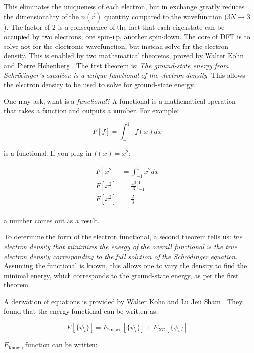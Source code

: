 This eliminates the uniqueness of each electron, but in exchange greatly reduces
the dimensionality of the $n(\vec r)$ quantity compared to the
wavefunction ($3N \rightarrow 3$). The
factor of 2 is a consequence of the fact that each eigenstate can be occupied
by two electrons, one spin-up, another spin-down. The core of DFT is
to solve not
for the electronic wavefunction, but instead solve for the electron
density. This
is enabled by two mathematical theorems, proved  by Walter Kohn and
Pierre Hohenberg \cite{hohenberg_kohn}.
The first theorem is: \textit{The ground-state energy from Schr\"odinger's
equation is a unique functional of the electron density.} This allows the
electron density to be used to solve for ground-state energy.

One may ask, what is a \textit{functional}? A functional is a mathematical
operation that takes a function and outputs a number. For example:

\begin{equation}
F[f] = \int_{-1}^1 f(x)dx
\end{equation}

\noindent is a functional. If you plug in $f(x) = x^2$:

\begin{align*}
F[x^2] &= \int_{-1}^1 x^2 dx \\
F[x^2] &= \frac{x^3}{3}\Biggr|_{-1}^1 \\
F[x^2] &= \frac{2}{3} \\
\end{align*}

\noindent a number comes out as a result.

\noindent To determine the form of the electron functional, a second
theorem tells
us: \textit{the electron density that minimizes the energy of
the overall functional is the true electron density corresponding to
the full solution of the Schrödinger equation.} Assuming the functional
is known, this allows one to vary the density to find the minimal energy,
which corresponds to the ground-state energy, as per the first theorem.

A derivation of equations is provided by Walter Kohn and Lu Jeu Sham
\cite{kohn_sham}. They found that the energy functional can be written as:

\begin{equation}
E[\{\psi_i\}] = E_{\text{known}}[\{\psi_i\}] + E_{\text{XC}}[\{\psi_i\}]
\end{equation}

\noindent $E_{\text{known}}$ function can be written:

